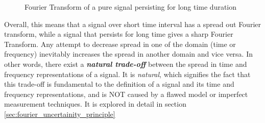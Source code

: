 \documentclass[11pt, a4paper]{article}
\begin{document}
	\begin{figure}[H]
		\centering
		\hfill
		
		\caption{Fourier Transform of a pure signal persisting for long time duration}
		\label{fig:pure_signal_and_its_spectrum_long_time}
	\end{figure}

	Overall, this means that a signal over short time interval has a spread out Fourier transform, while a signal that persists for long time gives a sharp Fourier Transform. Any attempt to decrease spread in one of the domain (time or frequency) inevitably increases the spread in another domain and vice versa. In other words, there exist a \textbf{\textit{natural trade-off}} between the spread in time and frequency representations of a signal. It is \textit{natural}, which signifies the fact that this trade-off is fundamental to the definition of a signal and its time and frequency representations, and is NOT caused by a flawed model or imperfect measurement techniques. It is explored in detail in section \ref{sec:fourier_uncertainity_principle}
	
\end{document}

